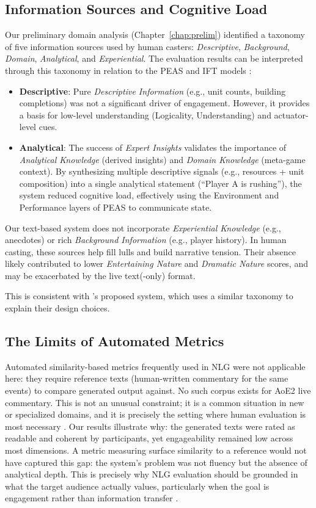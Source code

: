 \subsection{Information Sources and Cognitive Load}
Our preliminary domain analysis (Chapter~\ref{chap:prelim}) identified a taxonomy of five information sources used by human casters: \textit{Descriptive}, \textit{Background}, \textit{Domain}, \textit{Analytical}, and \textit{Experiential}. The evaluation results can be interpreted through this taxonomy in relation to the PEAS and IFT models \cite{dodge2018}:
\begin{itemize}[noitemsep,topsep=0pt]
  \item \textbf{Descriptive}: Pure \textit{Descriptive Information} (e.g., unit counts, building completions) was not a significant driver of engagement. However, it provides a basis for low-level understanding (Logicality, Understanding) and actuator-level cues.
  \item \textbf{Analytical}: The success of \textit{Expert Insights} validates the importance of \textit{Analytical Knowledge} (derived insights) and \textit{Domain Knowledge} (meta-game context). By synthesizing multiple descriptive signals (e.g., resources + unit composition) into a single analytical statement (``Player A is rushing''), the system reduced cognitive load, effectively using the Environment and Performance layers of PEAS to communicate state.
\end{itemize}

Our text-based system does not incorporate \textit{Experiential Knowledge} (e.g., anecdotes) or rich \textit{Background Information} (e.g., player history). In human casting, these sources help fill lulls and build narrative tension. Their absence likely contributed to lower \textit{Entertaining Nature} and \textit{Dramatic Nature} scores, and may be exacerbated by the live text(-only) format.

This is consistent with \citet{zheng2025}'s proposed system, which uses a similar taxonomy to explain their design choices.

\subsection{The Limits of Automated Metrics}
Automated similarity-based metrics \cite{papineni2002, lin2004, banerjee2005} frequently used in NLG were not applicable here: they require reference texts (human-written commentary for the same events) to compare generated output against. No such corpus exists for AoE2 live commentary. This is not an unusual constraint; it is a common situation in new or specialized domains, and it is precisely the setting where human evaluation is most necessary \cite{vanderlee2019}. Our results illustrate why: the generated texts were rated as readable and coherent by participants, yet engageability remained low across most dimensions. A metric measuring surface similarity to a reference would not have captured this gap: the system's problem was not fluency but the absence of analytical depth. This is precisely why NLG evaluation should be grounded in what the target audience actually values, particularly when the goal is engagement rather than information transfer \cite{vanderlee2021}.

